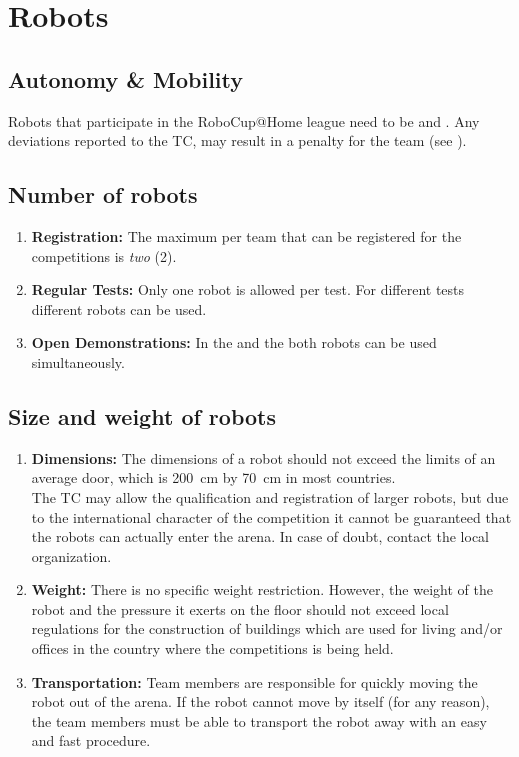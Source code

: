 \section{Robots}
\label{rule:robots}

\subsection{Autonomy \& Mobility}
Robots that participate in the RoboCup@Home league need to be  and . Any deviations reported to the TC, may result in a penalty for the team (see ).


\subsection{Number of robots}
\label{rule:robots_number}

\begin{enumerate}
	\item \textbf{Registration:} The maximum  per team that can be registered for the competitions is \emph{two} (2).
	\item \textbf{Regular Tests:} Only one robot is allowed per test. For different tests different robots can be used.
	\item \textbf{Open Demonstrations:} In the  and the  both robots can be used simultaneously.
\end{enumerate}


\subsection{Size and weight of robots}
\label{rule:robots_size}

\begin{enumerate}
	\item \textbf{Dimensions:} The dimensions of a robot should not exceed the limits of an average door, which is \SI{200}{\centi\meter} by \SI{70}{\centi\meter} in most countries.\\ 
	The TC may allow the qualification and registration of larger robots, but due to the international character of the competition it cannot be guaranteed that the robots can actually enter the arena. In case of doubt, contact the local organization. 
	\item \textbf{Weight:} There is no specific weight restriction. However, the weight of the robot and the pressure it exerts on the floor should not exceed local regulations for the construction of buildings which are used for living and/or offices in the country where the competitions is being held.
	\item \textbf{Transportation:} Team members are responsible for quickly moving the robot out of the arena.	If the robot cannot move by itself (for any reason), the team members must be able to transport the robot away with an easy and fast procedure.
\end{enumerate}



